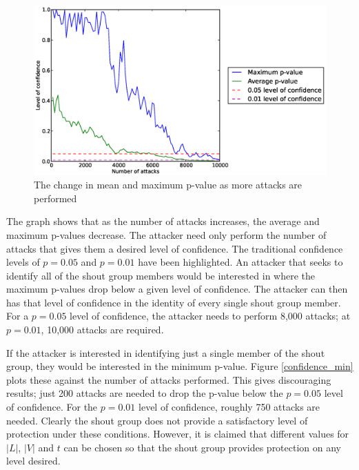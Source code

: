 \documentclass[ %
                    author={Luke Murray},
                supervisor={Dr. Simon Hollis},
                     title={Shadow Peer-to-Peer Networks},
                  subtitle={},
                    degree={MEng},
                      year={2013} ]{thesis}
\begin{document}
\begin{figure}[h]
    \centering
    \begin{minipage}[b]{0.8\linewidth}
        \centering
        \includegraphics[width=\linewidth]{diagrams/confidence.eps}
        \caption{The change in mean and maximum p-value as more attacks are performed}
    \end{minipage}
    \label{confidence}
\end{figure}

The graph shows that as the number of attacks increases, the average and maximum p-values decrease. The attacker need only perform the number of attacks that gives them a desired level of confidence. The traditional confidence levels of $p = 0.05$ and $p = 0.01$ have been highlighted. An attacker that seeks to identify all of the shout group members would be interested in where the maximum p-values drop below a given level of confidence. The attacker can then has that level of confidence in the identity of every single shout group member. For a $p = 0.05$ level of confidence, the attacker needs to perform 8,000 attacks; at $p = 0.01$, 10,000 attacks are required.

If the attacker is interested in identifying just a single member of the shout group, they would be interested in the minimum p-value. Figure \ref{confidence_min} plots these against the number of attacks performed. This gives discouraging results; just 200 attacks are needed to drop the p-value below the $p = 0.05$ level of confidence. For the $p = 0.01$ level of confidence, roughly 750 attacks are needed. Clearly the shout group does not provide a satisfactory level of protection under these conditions. However, it is claimed that different values for $|L|$, $|V|$ and $t$ can be chosen so that the shout group provides protection on any level desired.
\end{document}
